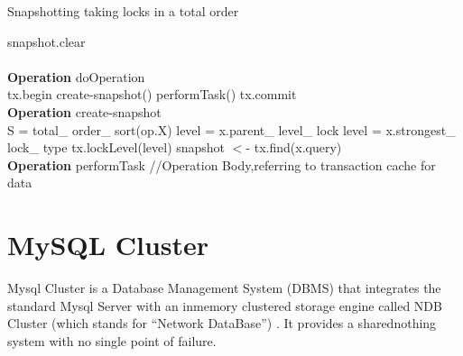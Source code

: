 \begin{algorithm}[h]
\caption{Snapshotting taking locks in a total order}
\label{hopAlgo}
\begin{algorithmic}

\State snapshot.clear \\ \\

\textbf{Operation } doOperation \\

\State tx.begin
\State create-snapshot()
\State performTask()
\State tx.commit\\

\State \textbf{Operation} create-snapshot \\
\State S = total\_ order\_ sort(op.X) 
\State level = x.parent\_ level\_ lock
\Else
\State level = x.strongest\_ lock\_ type
\State tx.lockLevel(level)
\State snapshot $<$- tx.find(x.query)
\EndIf
\EndFor
 \\ 
\State \textbf{Operation} performTask
\State //Operation Body,referring to transaction cache for data

\end{algorithmic}
\end{algorithm}

\section{MySQL Cluster}
Mysql  Cluster  is   a  Database  Management  System   (DBMS)  that  integrates   the  standard
Mysql  Server with an inmemory  clustered storage engine called NDB Cluster (which stands
for  “Network   DataBase”)  .  It  provides   a  sharednothing  system   with  no  single
point of failure.



